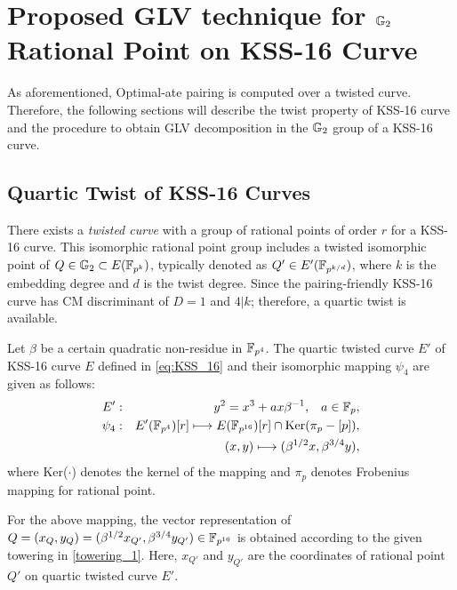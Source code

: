 \section{Proposed GLV technique for \texorpdfstring{${\mathbb{G}}_{2}$}{} Rational Point on  KSS-16 Curve} 
\label{Proposal}
As aforementioned, Optimal-ate pairing is computed over a twisted curve. 
Therefore, the following sections will describe the twist property of KSS-16 curve and the procedure to obtain GLV decomposition in the ${\mathbb{G}}_{2}$ group of a KSS-16 curve.

\subsection{Quartic Twist of KSS-16 Curves} 
\label{eq:quartic_twist_candar18_kss16}
There exists a \textit{twisted curve} with a group of rational points of order $r$ for a KSS-16 curve. 
This isomorphic rational point group includes a twisted isomorphic point of $Q \in {\mathbb{G}}_{2} \subset E(\mathbb{F}_{p^k})$, typically denoted as $Q' \in E'(\mathbb{F}_{p^{k/d}})$, where $k$ is the embedding degree and $d$ is the twist degree.  
Since the pairing-friendly KSS-16 \cite{EPRINT:KacSchSco07} curve has CM discriminant of $D = 1$ and $4|k$; therefore, a quartic twist is available.

Let $\beta$ be a certain quadratic non-residue in $\mathbb{F}_{p^4}$.  The quartic twisted curve $E'$ of KSS-16  curve $E$ defined in \eqref{eq:KSS_16} and  their isomorphic mapping $\psi_4$ are given as follows:
\begin{eqnarray} 
	E'&:&y^2=x^3+ax\beta^{-1},\;\;\;a\in{\mathbb{F}}_{p}, \label{twisted_E} \\ 
	\psi_4&:&E'(\mathbb{F}_{p^4})[r] \longmapsto E(\mathbb{F}_{p^{16}})[r]\cap {\rm Ker}(\pi_p-[p]),\nonumber\\
	&& \quad \quad (x,y)\longmapsto (\beta^{1/2}x,\beta^{3/4}y),
\end{eqnarray}
where Ker($\cdot$) denotes the kernel of the mapping and $\pi_p$ denotes Frobenius mapping  for rational point.

For the above mapping, the vector representation of $Q = (x_{Q},y_Q) = (\beta^{1/2}x_{Q'},\beta^{3/4}y_{Q'}) \in \mathbb{F}_{p^{16}}$ is obtained according to the given towering in \eqref{towering_1}.
Here, $x_{Q'}$ and $y_{Q'}$ are the coordinates of rational point $Q'$ on quartic twisted curve $E'$. 




